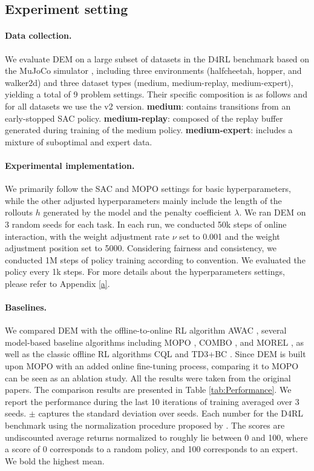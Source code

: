 \documentclass[letterpaper]{article} %
\begin{document}
\subsection{Experiment setting}
\paragraph{Data collection.} We evaluate DEM on a large subset of datasets in the D4RL benchmark \cite{d4rl} based on the MuJoCo simulator \cite{mujoco}, including three environments (halfcheetah, hopper, and walker2d) and three dataset types (medium, medium-replay, medium-expert), yielding a total of 9 problem settings. Their specific composition is as follows and for all datasets we use the v2 version. \textbf{medium}: contains transitions from an early-stopped SAC policy. \textbf{medium-replay}: composed of the replay buffer generated during training of the medium policy. \textbf{medium-expert}: includes a mixture of suboptimal and expert data.

\paragraph{Experimental implementation.} We primarily follow the SAC \cite{sac} and MOPO \cite{mopo} settings for basic hyperparameters, while the other adjusted hyperparameters mainly include the length of the rollouts $h$ generated by the model and the penalty coefficient $\lambda$. We ran DEM on 3 random seeds for each task. In each run, we conducted 50k steps of online interaction, with the weight adjustment rate $\nu$ set to 0.001 and the weight adjustment position set to 5000. Considering fairness and consistency, we conducted 1M steps of policy training according to convention. We evaluated the policy every 1k steps. For more details about the hyperparameters settings, please refer to Appendix \ref{a}.

\paragraph{Baselines.} We compared DEM with the offline-to-online RL algorithm AWAC \cite{awac}, several model-based baseline algorithms including MOPO \cite{mopo}, COMBO \cite{combo}, and MOREL \cite{morel}, as well as the classic offline RL algorithms CQL \cite{cql} and TD3+BC \cite{minimalist}. Since DEM is built upon MOPO with an added online fine-tuning process, comparing it to MOPO can be seen as an ablation study. All the results were taken from the original papers. The comparison results are presented in Table \ref{tab:Performance}. We report the performance during the last 10 iterations of training averaged over 3 seeds. $\pm$ captures the standard deviation over seeds. Each number for the D4RL benchmark using the normalization procedure proposed by \cite{d4rl}. The scores are undiscounted average returns normalized to roughly lie between 0 and 100, where a score of 0 corresponds to a random policy, and 100 corresponds to an expert. We bold the highest mean.
\end{document}
